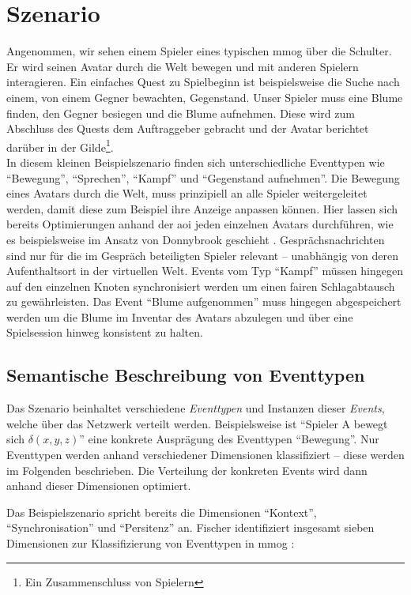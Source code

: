 \section{Szenario}
\label{chap:grundlagen:szenario}
Angenommen, wir sehen einem Spieler eines typischen \ac{mmog} über die Schulter. Er wird seinen Avatar durch die Welt bewegen und mit anderen Spielern interagieren. Ein einfaches Quest zu Spielbeginn ist beispielsweise die Suche nach einem, von einem Gegner bewachten, Gegenstand. Unser Spieler muss eine Blume finden, den Gegner besiegen und die Blume aufnehmen. Diese wird zum Abschluss des Quests dem Auftraggeber gebracht und der Avatar berichtet darüber in der Gilde\footnote{Ein Zusammenschluss von Spielern}.\\
In diesem kleinen Beispielszenario finden sich unterschiedliche Eventtypen wie \enquote{Bewegung}, \enquote{Sprechen}, \enquote{Kampf} und \enquote{Gegenstand aufnehmen}. Die Bewegung eines Avatars durch die Welt, muss prinzipiell an alle Spieler weitergeleitet werden, damit diese zum Beispiel ihre Anzeige anpassen können. Hier lassen sich bereits Optimierungen anhand der \ac{aoi} jeden einzelnen Avatars durchführen, wie es beispielsweise im Ansatz von Donnybrook geschieht \cite{Bharambe2008Donnybrook}. Gesprächsnachrichten sind nur für die im Gespräch beteiligten Spieler relevant -- unabhängig von deren Aufenthaltsort in der virtuellen Welt. Events vom Typ \enquote{Kampf} müssen hingegen auf den einzelnen Knoten synchronisiert werden um einen fairen Schlagabtausch zu gewährleisten. Das Event \enquote{Blume aufgenommen} muss hingegen abgespeichert werden um die Blume im Inventar des Avatars abzulegen und über eine Spielsession hinweg konsistent zu halten.

\subsection{Semantische Beschreibung von Eventtypen}
Das Szenario beinhaltet verschiedene \emph{Eventtypen} und Instanzen dieser \emph{Events}, welche über das Netzwerk verteilt werden. Beispielsweise ist \enquote{Spieler A bewegt sich $\delta(x,y,z)$} eine konkrete Ausprägung des Eventtypen \enquote{Bewegung}. Nur Eventtypen werden anhand verschiedener Dimensionen klassifiziert -- diese werden im Folgenden beschrieben. Die Verteilung der konkreten Events wird dann anhand dieser Dimensionen optimiert.

Das Beispielszenario spricht bereits die Dimensionen \enquote{Kontext}, \enquote{Synchronisation} und \enquote{Persitenz} an. Fischer identifiziert insgesamt sieben Dimensionen zur Klassifizierung von Eventtypen in \ac{mmog} \cite{Fischer2010Event}:

